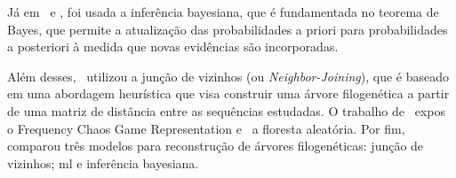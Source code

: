 Já em~\textit{} e \textit{}, foi usada a inferência bayesiana, que é fundamentada no teorema de Bayes, que permite a atualização das probabilidades a priori para probabilidades a posteriori à medida que novas evidências são incorporadas.

Além desses,~\textit{\citeauthor{potdar_phylogenetic_2021}} utilizou a junção de vizinhos (ou \textit{Neighbor-Joining}), que é baseado em uma abordagem heurística que visa construir uma árvore filogenética a partir de uma matriz de distância entre as sequências estudadas. O trabalho de~\citeauthor{lichtblau_alignment-free_2019} expos o Frequency Chaos Game Representation e~\textit{\citeauthor{kim_ngs_2022}} a floresta aleatória. Por fim,~\textit{\citeauthor{dimitrov_updated_2019}} comparou três modelos para reconstrução de árvores filogenéticas: junção de vizinhos; \gls{ml} e inferência bayesiana.